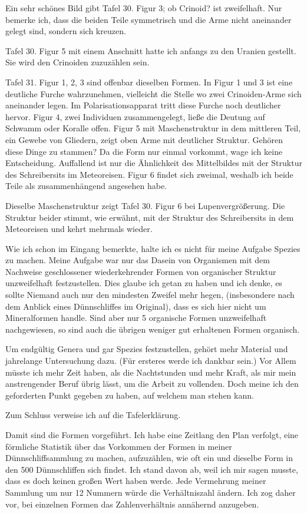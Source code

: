 \documentclass[a4paper, 12pt, oneside]{article}
\begin{document}
Ein sehr schönes Bild gibt Tafel 30. Figur 3; ob Crinoid? ist zweifelhaft. Nur bemerke ich, dass die beiden Teile symmetrisch und die Arme nicht aneinander gelegt sind, sondern sich kreuzen.

Tafel 30. Figur 5 mit einem Anschnitt hatte ich anfangs zu den Uranien gestellt. Sie wird den Crinoiden zuzuzählen sein.

Tafel 31. Figur 1, 2, 3 sind offenbar dieselben Formen. In Figur 1 und 3 ist eine deutliche Furche wahrzunehmen, vielleicht die Stelle wo zwei Crinoiden-Arme sich aneinander legen. Im Polarisationsapparat tritt diese Furche noch deutlicher hervor. Figur 4, zwei Individuen zusammengelegt, ließe die Deutung auf Schwamm oder Koralle offen. Figur 5 mit Maschenstruktur in dem mittleren Teil, ein Gewebe von Gliedern, zeigt oben Arme mit deutlicher Struktur. Gehören diese Dinge zu stammen? Da die Form nur einmal vorkommt, wage ich keine Entscheidung. Auffallend ist nur die Ähnlichkeit des Mittelbildes mit der Struktur des Schreibersits im Meteoreisen. Figur 6 findet sich zweimal, weshalb ich beide Teile als zusammenhängend angesehen habe.

Dieselbe Maschenstruktur zeigt Tafel 30. Figur 6 bei Lupenvergrößerung. Die Struktur beider stimmt, wie erwähnt, mit der Struktur des Schreibersits in dem Meteoreisen und kehrt mehrmals wieder.

Wie ich schon im Eingang bemerkte, halte ich es nicht für meine Aufgabe Spezies zu machen. Meine Aufgabe war nur das Dasein von Organismen mit dem Nachweise geschlossener wiederkehrender Formen von organischer Struktur unzweifelhaft festzustellen. Dies glaube ich getan zu haben und ich denke, es sollte Niemand auch nur den mindesten Zweifel mehr hegen, (insbesondere nach dem Anblick eines Dünnschliffes im Original), dass es sich hier nicht um Mineralformen handle. Sind aber nur 5 organische Formen unzweifelhaft nachgewiesen, so sind auch die übrigen weniger gut erhaltenen Formen organisch.

Um endgültig Genera und gar Spezies festzustellen, gehört mehr Material und jahrelange Untersuchung dazu. (Für ersteres werde ich dankbar sein.) Vor Allem müsste ich mehr Zeit haben, als die Nachtstunden und mehr Kraft, als mir mein anstrengender Beruf übrig lässt, um die Arbeit zu vollenden. Doch meine ich den geforderten Punkt gegeben zu haben, auf welchem man stehen kann.

Zum Schluss verweise ich auf die Tafelerklärung.

Damit sind die Formen vorgeführt. Ich habe eine Zeitlang den Plan verfolgt, eine förmliche Statistik über das Vorkommen der Formen in meiner Dünnschliffsammlung zu machen, aufzuzählen, wie oft ein und dieselbe Form in den 500 Dünnschliffen sich findet. Ich stand davon ab, weil ich mir sagen musste, dass es doch keinen großen Wert haben werde. Jede Vermehrung meiner Sammlung um nur 12 Nummern würde die Verhältniszahl ändern. Ich zog daher vor, bei einzelnen Formen das Zahlenverhältnis annähernd anzugeben.
\clearpage
\end{document}
